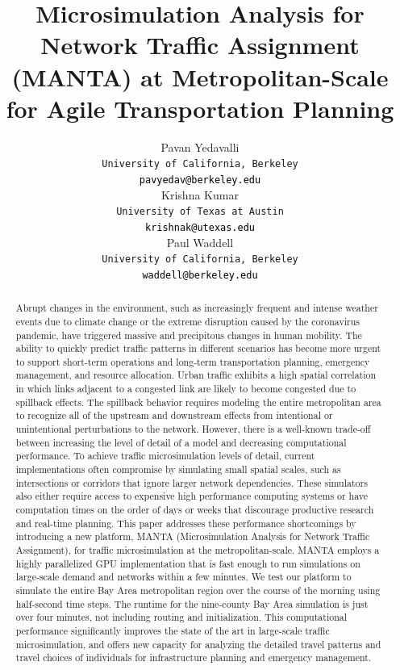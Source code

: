 \documentclass[final]{IEEEtran}
\title{Microsimulation Analysis for Network Traffic Assignment (MANTA) at Metropolitan-Scale for Agile Transportation Planning}
\author{
\large{Pavan Yedavalli}\\
\texttt{University of California, Berkeley}\\
\texttt{\textcolor{black}{pavyedav@berkeley.edu}}\\
\large{Krishna Kumar} \\
\texttt{University of Texas at Austin}\\
\texttt{\textcolor{black}{krishnak@utexas.edu}}\\
\large{Paul Waddell} \\
\texttt{University of California, Berkeley}\\
\texttt{\textcolor{black}{waddell@berkeley.edu}}\\
}
\begin{document}
\maketitle 

\begin{abstract}
Abrupt changes in the environment, such as increasingly frequent and intense weather events due to climate change or the extreme disruption caused by the coronavirus pandemic, have triggered massive and precipitous changes in human mobility. The ability to quickly predict traffic patterns in different scenarios has become more urgent to support short-term operations and long-term transportation planning, emergency management, and resource allocation. Urban traffic exhibits a high spatial correlation in which links adjacent to a congested link are likely to become congested due to spillback effects. The spillback behavior requires modeling the entire metropolitan area to recognize all of the upstream and downstream effects from intentional or unintentional perturbations to the network. However, there is a well-known trade-off between increasing the level of detail of a model and decreasing computational performance. To achieve traffic microsimulation levels of detail, current implementations often compromise by simulating small spatial scales, such as intersections or corridors that ignore larger network dependencies. These simulators also either require access to expensive high performance computing systems or have computation times on the order of days or weeks that discourage productive research and real-time planning. This paper addresses these performance shortcomings by introducing a new platform, MANTA (Microsimulation Analysis for Network Traffic Assignment), for traffic microsimulation at the metropolitan-scale. MANTA employs a highly parallelized GPU implementation that is fast enough to run simulations on large-scale demand and networks within a few minutes. We test our platform to simulate the entire Bay Area metropolitan region over the course of the morning using half-second time steps. The runtime for the nine-county Bay Area simulation is just over four minutes, not including routing and initialization. This computational performance significantly improves the state of the art in large-scale traffic microsimulation, and offers new capacity for analyzing the detailed travel patterns and travel choices of individuals for infrastructure planning and emergency management.
\end{abstract}
\end{document}

